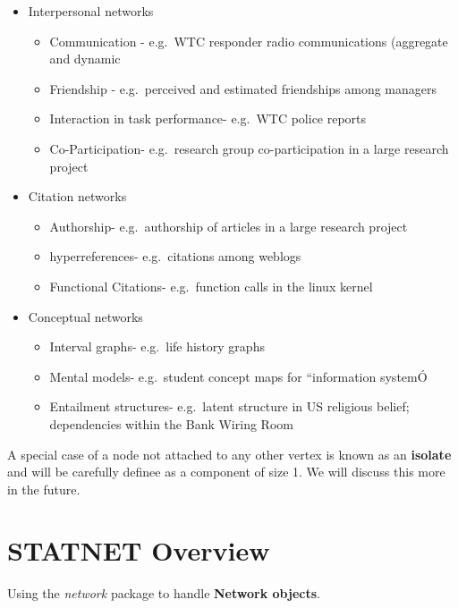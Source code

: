 \documentclass[]{book}
\providecommand{\tightlist}{%
  \setlength{\itemsep}{0pt}\setlength{\parskip}{0pt}}
\theoremstyle{definition}
\theoremstyle{definition}
\theoremstyle{definition}
\theoremstyle{remark}
\begin{document}
\begin{itemize}
\tightlist
\item
  Interpersonal networks

  \begin{itemize}
  \tightlist
  \item
    Communication - e.g.~WTC responder radio communications (aggregate
    and dynamic
  \item
    Friendship - e.g.~perceived and estimated friendships among managers
  \item
    Interaction in task performance- e.g.~WTC police reports
  \item
    Co-Participation- e.g.~research group co-participation in a large
    research project
  \end{itemize}
\item
  Citation networks

  \begin{itemize}
  \tightlist
  \item
    Authorship- e.g.~authorship of articles in a large research project
  \item
    hyperreferences- e.g.~citations among weblogs
  \item
    Functional Citations- e.g.~function calls in the linux kernel
  \end{itemize}
\item
  Conceptual networks

  \begin{itemize}
  \tightlist
  \item
    Interval graphs- e.g.~life history graphs
  \item
    Mental models- e.g.~student concept maps for ``information systemÓ
  \item
    Entailment structures- e.g.~latent structure in US religious belief;
    dependencies within the Bank Wiring Room
  \end{itemize}
\end{itemize}

A special case of a node not attached to any other vertex is known as an
\textbf{isolate} and will be carefully definee as a component of size 1.
We will discuss this more in the future.

\section{STATNET Overview}\label{statnet-overview}

Using the \emph{network} package to handle \textbf{Network objects}.
\end{document}
